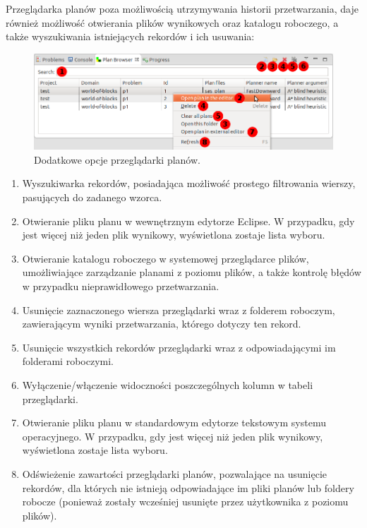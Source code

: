 Przeglądarka planów poza możliwością utrzymywania historii przetwarzania, daje również możliwość otwierania plików wynikowych oraz katalogu roboczego, a także wyszukiwania istniejących rekordów i ich usuwania:

\begin{figure}[h!]
    \centering
    \includegraphics[width=\textwidth]{img/plan_browser_options}
    \caption{Dodatkowe opcje przeglądarki planów.}
    \label{fig:plan_browser_options}
\end{figure}

\begin{enumerate}
\item Wyszukiwarka rekordów, posiadająca możliwość prostego filtrowania wierszy, pasujących do zadanego wzorca.
\item Otwieranie pliku planu w wewnętrznym edytorze Eclipse. W przypadku, gdy jest więcej niż jeden plik wynikowy, wyświetlona zostaje lista wyboru.
\item Otwieranie katalogu roboczego w systemowej przeglądarce plików, umożliwiające zarządzanie planami z poziomu plików, a także kontrolę błędów w przypadku nieprawidłowego przetwarzania.
\item Usunięcie zaznaczonego wiersza przeglądarki wraz z folderem roboczym, zawierającym wyniki przetwarzania, którego dotyczy ten rekord.
\item Usunięcie wszystkich rekordów przeglądarki wraz z odpowiadającymi im folderami roboczymi.
\item Wyłączenie/włączenie widoczności poszczególnych kolumn w tabeli przeglądarki.
\item Otwieranie pliku planu w standardowym edytorze tekstowym systemu operacyjnego. W przypadku, gdy jest więcej niż jeden plik wynikowy, wyświetlona zostaje lista wyboru.
\item Odświeżenie zawartości przeglądarki planów, pozwalające na usunięcie rekordów, dla których nie istnieją odpowiadające im pliki planów lub foldery robocze (ponieważ zostały wcześniej usunięte przez użytkownika z poziomu plików).
\end{enumerate}

